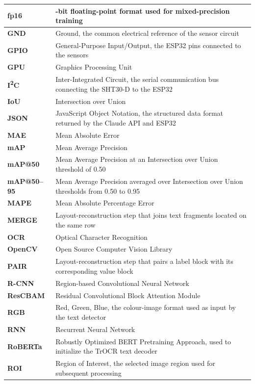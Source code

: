 \begin{longtable}{|>{\raggedright\arraybackslash}p{3.4cm}|>{\raggedright\arraybackslash}p{10.4cm}|}
\hline
\textbf{fp16} & 16-bit floating-point format used for mixed-precision training \\
\hline
\textbf{GND} & Ground, the common electrical reference of the sensor circuit \\
\hline
\textbf{GPIO} & General-Purpose Input/Output, the ESP32 pins connected to the sensors \\
\hline
\textbf{GPU} & Graphics Processing Unit \\
\hline
\textbf{I\textsuperscript{2}C} & Inter-Integrated Circuit, the serial communication bus connecting the \mbox{SHT30-D} to the ESP32 \\
\hline
\textbf{IoU} & Intersection over Union \\
\hline
\textbf{JSON} & JavaScript Object Notation, the structured data format returned by the Claude API and ESP32 \\
\hline
\textbf{MAE} & Mean Absolute Error \\
\hline
\textbf{mAP} & Mean Average Precision \\
\hline
\textbf{mAP@50} & Mean Average Precision at an Intersection over Union threshold of 0.50 \\
\hline
\textbf{mAP@50--95} & Mean Average Precision averaged over Intersection over Union thresholds from 0.50 to 0.95 \\
\hline
\textbf{MAPE} & Mean Absolute Percentage Error \\
\hline
\textbf{MERGE} & Layout-reconstruction step that joins text fragments located on the same row \\
\hline
\textbf{OCR} & Optical Character Recognition \\
\hline
\textbf{OpenCV} & Open Source Computer Vision Library \\
\hline
\textbf{PAIR} & Layout-reconstruction step that pairs a label block with its corresponding value block \\
\hline
\textbf{R-CNN} & Region-based Convolutional Neural Network \\
\hline
\textbf{ResCBAM} & Residual Convolutional Block Attention Module \\
\hline
\textbf{RGB} & Red, Green, Blue, the colour-image format used as input by the text detector \\
\hline
\textbf{RNN} & Recurrent Neural Network \\
\hline
\textbf{RoBERTa} & Robustly Optimized BERT Pretraining Approach, used to initialize the TrOCR text decoder \\
\hline
\textbf{ROI} & Region of Interest, the selected image region used for subsequent processing \\

\end{longtable}
